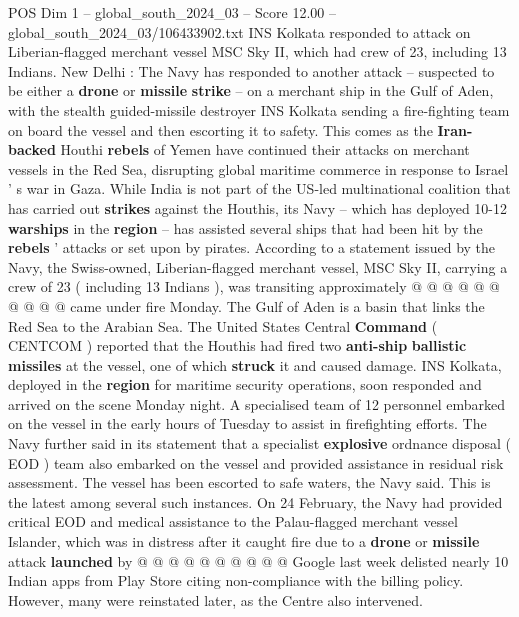 \begin{textsample}{POS Dim 1 – global\_south\_2024\_03 – Score 12.00 – global\_south\_2024\_03/106433902.txt}  \label{ex:f1_pos_348}
INS Kolkata responded to attack on Liberian-flagged merchant vessel MSC Sky II, which had crew of 23, including 13 Indians.
New Delhi : The Navy has responded to another attack -- suspected to be either a \textbf{drone} or \textbf{missile} \textbf{strike} -- on a merchant ship in the Gulf of Aden, with the stealth guided-missile destroyer INS Kolkata sending a fire-fighting team on board the vessel and then escorting it to safety.
This comes as the \textbf{Iran-backed} Houthi \textbf{rebels} of Yemen have continued their attacks on merchant vessels in the Red Sea, disrupting global maritime commerce in response to Israel ' s war in Gaza.
While India is not part of the US-led multinational coalition that has carried out \textbf{strikes} against the Houthis, its Navy -- which has deployed 10-12 \textbf{warships} in the \textbf{region} -- has assisted several ships that had been hit by the \textbf{rebels} ' attacks or set upon by pirates.
According to a statement issued by the Navy, the Swiss-owned, Liberian-flagged merchant vessel, MSC Sky II, carrying a crew of 23 ( including 13 Indians ), was transiting approximately @ @ @ @ @ @ @ @ @ @ came under fire Monday.
The Gulf of Aden is a basin that links the Red Sea to the Arabian Sea.
The United States Central \textbf{Command} ( CENTCOM ) reported that the Houthis had fired two \textbf{anti-ship} \textbf{ballistic} \textbf{missiles} at the vessel, one of which \textbf{struck} it and caused damage.
INS Kolkata, deployed in the \textbf{region} for maritime security operations, soon responded and arrived on the scene Monday night.
A specialised team of 12 personnel embarked on the vessel in the early hours of Tuesday to assist in firefighting efforts.
The Navy further said in its statement that a specialist \textbf{explosive} ordnance disposal ( EOD ) team also embarked on the vessel and provided assistance in residual risk assessment.
The vessel has been escorted to safe waters, the Navy said.
This is the latest among several such instances.
On 24 February, the Navy had provided critical EOD and medical assistance to the Palau-flagged merchant vessel Islander, which was in distress after it caught fire due to a \textbf{drone} or \textbf{missile} attack \textbf{launched} by @ @ @ @ @ @ @ @ @ @ Google last week delisted nearly 10 Indian apps from Play Store citing non-compliance with the billing policy.
However, many were reinstated later, as the Centre also intervened.

\end{textsample}

